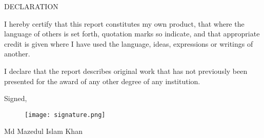 \begin{center}
    DECLARATION
    \vspace{5mm} %
\end{center}

I hereby certify that this report constitutes my own product, that where the language of others is set forth, quotation marks so indicate, and that appropriate credit is given where I have used the language, ideas, expressions or writings of another.

\vspace{1em}

I declare that the report describes original work that has not previously been presented for the award of any other degree of any institution.

\vspace{2em}

\noindent\hspace{8cm}Signed,
\begin{figure}[H]
    \hspace{8cm}
    \texttt{[image: signature.png]}  %
\end{figure}

\noindent\hspace{8cm}Md Mazedul Islam Khan  %
